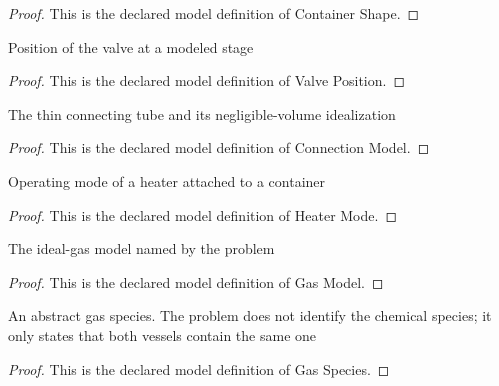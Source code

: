 \begin{proof}
  This is the declared model definition of Container Shape.
\end{proof}
\begin{definition}
  \label{def:physics:phyx-mini-0376:phyxminiproblems-problemphyxmini0376-valveposition}
  Position of the valve at a modeled stage
\end{definition}
\begin{proof}
  This is the declared model definition of Valve Position.
\end{proof}
\begin{definition}
  \label{def:physics:phyx-mini-0376:phyxminiproblems-problemphyxmini0376-connectionmodel}
  The thin connecting tube and its negligible-volume idealization
\end{definition}
\begin{proof}
  This is the declared model definition of Connection Model.
\end{proof}
\begin{definition}
  \label{def:physics:phyx-mini-0376:phyxminiproblems-problemphyxmini0376-heatermode}
  Operating mode of a heater attached to a container
\end{definition}
\begin{proof}
  This is the declared model definition of Heater Mode.
\end{proof}
\begin{definition}
  \label{def:physics:phyx-mini-0376:phyxminiproblems-problemphyxmini0376-gasmodel}
  The ideal-gas model named by the problem
\end{definition}
\begin{proof}
  This is the declared model definition of Gas Model.
\end{proof}
\begin{definition}
  \label{def:physics:phyx-mini-0376:phyxminiproblems-problemphyxmini0376-gasspecies}
  An abstract gas species. The problem does not identify the chemical species; it only states that both vessels contain the same one
\end{definition}
\begin{proof}
  This is the declared model definition of Gas Species.
\end{proof}
